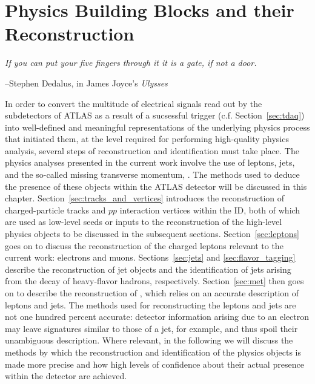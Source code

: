 \chapter{Physics Building Blocks and their Reconstruction}
\label{chap:objects}

\epigraph{\textit{If you can put your five fingers through it it is a gate, if not a door.}}{--Stephen Dedalus, in James Joyce's \textit{Ulysses}}

In order to convert the multitude of electrical signals read out by the subdetectors
of ATLAS as a result of a sucsessful trigger (c.f. Section~\ref{sec:tdaq})
into well-defined and meaningful representations of the underlying physics process
that initiated them, at the level required for performing high-quality physics analysis,
several steps of reconstruction and identification must take place.
The physics analyses presented in the current work involve the use of leptons,
jets, and the so-called missing transverse momentum, \ptmiss.
The methods used to deduce the presence of these objects within the ATLAS detector
will be discussed in this chapter.
Section~\ref{sec:tracks_and_vertices} introduces the reconstruction of charged-particle
tracks and $pp$ interaction vertices within the ID, both of which are used as low-level seeds or inputs to the
reconstruction of the high-level physics objects to be discussed in the subsequent
sections.
Section~\ref{sec:leptons} goes on to discuss the reconstruction of the charged leptons
relevant to the current work: electrons and muons.
Sections~\ref{sec:jets} and \ref{sec:flavor_tagging} describe the reconstruction
of jet objects and the identification of jets arising from the decay of heavy-flavor hadrons,
respectively.
Section~\ref{sec:met} then goes on to describe the reconstruction of \ptmiss,
which relies on an accurate description of leptons and jets.
The methods used for reconstructing the leptons and jets are not one hundred percent
accurate: detector information arising due to an electron may leave signatures
similar to those of a jet, for example, and thus spoil their unambiguous description.
Where relevant, in the following we will discuss the methods by which the reconstruction
and identification of the physics objects is made more precise and how high levels
of confidence about their actual presence within the detector are achieved.

